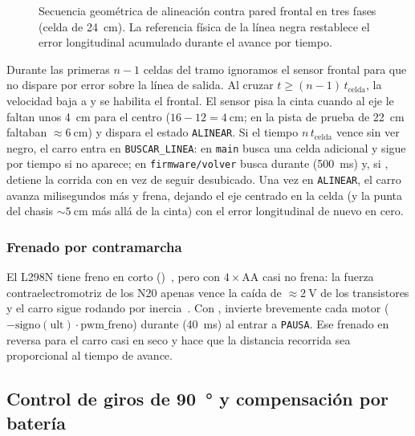 \begin{figure}[htbp]
  \centering
  
  \caption{Secuencia geométrica de alineación contra pared frontal en tres fases (celda de \SI{24}{\centi\meter}). La referencia física de la línea negra restablece el error longitudinal acumulado durante el avance por tiempo.}
  \label{fig:alineacion-pared}
\end{figure}

Durante las primeras $n - 1$ celdas del tramo ignoramos el sensor frontal para que no dispare por error sobre la línea de salida. Al cruzar $t \ge (n - 1)\,t_{\text{celda}}$, la velocidad baja a  y se habilita el frontal. El sensor pisa la cinta cuando al eje le faltan unos \SI{4}{\centi\meter} para el centro ($16 - 12 = \SI{4}{\centi\meter}$; en la pista de prueba de \SI{22}{\centi\meter} faltaban $\approx\SI{6}{\centi\meter}$) y dispara el estado \texttt{ALINEAR}. Si el tiempo $n\,t_{\text{celda}}$ vence sin ver negro, el carro entra en \texttt{BUSCAR\_LINEA}: en \texttt{main} busca una celda adicional y sigue por tiempo si no aparece; en \texttt{firmware/volver} busca durante  (\SI{500}{\milli\second}) y, si , detiene la corrida con  en vez de seguir desubicado. Una vez en \texttt{ALINEAR}, el carro avanza  milisegundos más y frena, dejando el eje centrado en la celda (y la punta del chasis $\sim\SI{5}{\centi\meter}$ más allá de la cinta) con el error longitudinal de nuevo en cero.

\subsubsection{Frenado por contramarcha}
El L298N tiene freno en corto ()~\cite{st2000l298n}, pero con $4\times\text{AA}$ casi no frena: la fuerza contraelectromotriz de los N20 apenas vence la caída de $\approx\SI{2}{\volt}$ de los transistores y el carro sigue rodando por inercia~\cite{arquitectura2026doc}. Con ,  invierte brevemente cada motor ($-\mathrm{signo}(\text{ult}) \cdot \text{pwm\_freno}$) durante  (\SI{40}{\milli\second}) al entrar a \texttt{PAUSA}. Ese frenado en reversa para el carro casi en seco y hace que la distancia recorrida sea proporcional al tiempo de avance.

\subsection{Control de giros de \SI{90}{\degree} y compensación por batería}
\label{subsec:giros}

